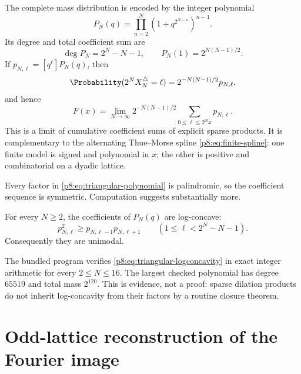 \documentclass[11pt]{article}
\theoremstyle{definition}
\theoremstyle{remark}
\begin{document}
The complete mass distribution is encoded by the integer polynomial
\begin{equation}
 \boxed{\displaystyle
 P_N(q)=\prod_{n=2}^{N}
       \left(1+q^{2^{N-n}}\right)^{n-1}.}                \label{p8:eq:triangular-polynomial}
\end{equation}
Its degree and total coefficient sum are
\begin{equation}
 \deg P_N=2^N-N-1,
 \qquad
 P_N(1)=2^{N(N-1)/2}.                                    \label{p8:eq:triangular-polynomial-data}
\end{equation}
If $p_{N,\ell}=[q^\ell]P_N(q)$, then
\begin{equation}
 \Probability(2^NX_N^\triangle=\ell)
 =2^{-N(N-1)/2}p_{N,\ell},                              \label{p8:eq:triangular-mass}
\end{equation}
and hence
\begin{equation}
 F(x)=\lim_{N\to\infty}
 2^{-N(N-1)/2}
 \sum_{0\le\ell\le2^Nx}p_{N,\ell}.                    \label{p8:eq:triangular-coefficient-limit}
\end{equation}
This is a limit of cumulative coefficient sums of explicit sparse products.
It is complementary to the alternating Thue--Morse spline
\eqref{p8:eq:finite-spline}: one finite model is signed and polynomial in $x$;
the other is positive and combinatorial on a dyadic lattice.

Every factor in \eqref{p8:eq:triangular-polynomial} is palindromic, so the
coefficient sequence is symmetric.  Computation suggests substantially more.

\begin{conjecture}
\label{p8:conj:triangular-logconcavity}
For every $N\ge2$, the coefficients of $P_N(q)$ are log-concave:
\begin{equation}
 p_{N,\ell}^2\ge p_{N,\ell-1}p_{N,\ell+1}
 \qquad(1\le\ell<2^N-N-1).                              \label{p8:eq:triangular-logconcavity}
\end{equation}
Consequently they are unimodal.
\end{conjecture}

\numerical The bundled program verifies
\eqref{p8:eq:triangular-logconcavity} in exact integer arithmetic for every
$2\le N\le16$.  The largest checked polynomial has degree $65519$ and total
mass $2^{120}$.  This is evidence, not a proof: sparse dilation products do
not inherit log-concavity from their factors by a routine closure theorem.

\section{Odd-lattice reconstruction of the Fourier image}
\label{p8:sec:shannon}
\end{document}
